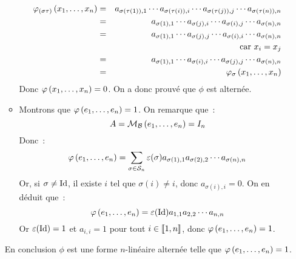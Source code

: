 \documentclass{magnolia}
\begin{document}
\begin{preuve}
\begin{itemize}
\begin{itemize}
\begin{eqnarray*}
    \varphi_{\left(\sigma\tau\right)}\left(x_1,\ldots,x_n\right)
    &=& a_{\sigma\left(\tau\left(1\right)\right),1}\cdots a_{\sigma\left(\tau(i)\right),i} \cdots
        a_{\sigma\left(\tau(j)\right),j} \cdots a_{\sigma\left(\tau(n)\right),n}\\
    &=& a_{\sigma\left(1\right),1}\cdots a_{\sigma(j),i} \cdots
        a_{\sigma(i),j} \cdots a_{\sigma(n),n}\\
    &=& a_{\sigma\left(1\right),1}\cdots a_{\sigma(j),j} \cdots
        a_{\sigma(i),i} \cdots a_{\sigma(n),n}\\
    & & \text{car $x_i=x_j$}\\
    &=& a_{\sigma\left(1\right),1}\cdots a_{\sigma(i),i} \cdots
        a_{\sigma(j),j} \cdots a_{\sigma(n),n}\\
    &=& \varphi_\sigma \left(x_1,\ldots,x_n\right)
    \end{eqnarray*}
    Donc $\varphi\left(x_1,\ldots,x_n\right)=0$. On a donc prouvé que $\phi$ est alternée.
  \item Montrons que $\varphi\left(e_1,\ldots,e_n\right)=1$. On remarque que~:
    \[A=\mathcal{M}_{\mathcal{B}}\left(e_1,\ldots,e_n\right)=I_n\]
    Donc~:
    \[\phi\p{e_1,\ldots,e_n}=\sum_{\sigma\in\gsym{n}} \signat{\sigma}
      a_{\sigma\p{1},1}a_{\sigma\p{2},2}\cdots a_{\sigma(n),n}\]
    Or, si $\sigma\neq \operatorname{Id}$, il existe $i$ tel que $\sigma(i)\neq i$, donc
    $a_{\sigma(i),i}=0$. On en déduit que~:
    \[\phi\p{e_1,\ldots,e_n}=\signat{\id}a_{1,1}a_{2,2}\cdots a_{n,n}\]
    Or $\signat{\id}=1$ et $a_{i,i}=1$ pour tout $i\in\left\llbracket 1,n\right\rrbracket$, donc
    $\varphi\left(e_1,\ldots,e_n\right)=1$.
  \end{itemize}
  En conclusion $\phi$ est une forme $n$-linéaire alternée telle que
  $\varphi\left(e_1,\ldots,e_n\right)=1$.
\end{itemize}
\end{preuve}
\end{document}
